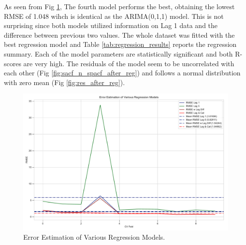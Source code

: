 \documentclass[]{article}
\begin{document}
As seen from Fig \ref{fig:error_estimation_3}, The fourth model performs the best, obtaining the lowest RMSE of 1.048 wihch is identical as the ARIMA(0,1,1) model. This is not surprising since both models utilized information on Lag 1 data and the difference between previous two values. The whole dataset was fitted with the best regression model and Table \ref{tab:regression_results} reports the regression summary. Each of the model parameters are statistically significant and both R-scores are very high. The residuals of the model seem to be uncorrelated with each other (Fig \ref{fig:sacf_n_spacf_after_reg}) and follows a normal distribution with zero mean (Fig \ref{fig:res_after_reg}). 

%
\begin{figure}[hbtp]
	\centering
	\includegraphics[width=1\columnwidth]{../Figures/error_estimation_3.pdf}
	\caption{Error Estimation of Various Regression Models.}
	\label{fig:error_estimation_3}
\end{figure}
%
\end{document}
